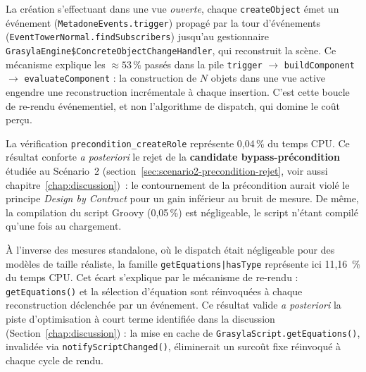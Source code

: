 La création s'effectuant dans une vue \emph{ouverte}, chaque \texttt{createObject}
émet un événement (\texttt{MetadoneEvents.trigger}) propagé par la tour
d'événements (\texttt{EventTowerNormal.findSubscribers}) jusqu'au gestionnaire
\texttt{GrasylaEngine\$ConcreteObjectChangeHandler}, qui reconstruit la scène.
Ce mécanisme explique les $\approx 53\,\%$ passés dans la pile
\texttt{trigger} $\rightarrow$ \texttt{buildComponent} $\rightarrow$
\texttt{evaluateComponent} : la construction de $N$ objets dans une vue active
engendre une reconstruction incrémentale à chaque insertion. C'est cette boucle
de re-rendu événementiel, et non l'algorithme de dispatch, qui domine le coût
perçu.

La vérification \texttt{precondition\_createRole} représente 0,04\,\% du temps
CPU. Ce résultat conforte \emph{a posteriori} le rejet de la
\textbf{candidate \og bypass-précondition \fg{}} étudiée au Scénario~2
(section~\ref{sec:scenario2-precondition-rejet}, voir aussi
chapitre~\ref{chap:discussion})~: le contournement de la précondition aurait
violé le principe \emph{Design by Contract} pour un gain inférieur au bruit
de mesure. De même, la compilation du script Groovy (0,05\,\%) est négligeable,
le script n'étant compilé qu'une fois au chargement.

À l'inverse des mesures standalone, où le dispatch était négligeable pour des
modèles de taille réaliste, la famille \texttt{getEquations|hasType} représente
ici 11,16~\% du temps CPU. Cet écart s'explique par le mécanisme de re-rendu :
\texttt{getEquations()} et la sélection d'équation sont réinvoquées à chaque
reconstruction déclenchée par un événement. Ce résultat valide \emph{a
posteriori} la piste d'optimisation à court terme identifiée dans la discussion
(Section~\ref{chap:discussion}) : la mise en cache de
\texttt{GrasylaScript.getEquations()}, invalidée via \texttt{notifyScriptChanged()},
éliminerait un surcoût fixe réinvoqué à chaque cycle de rendu.

